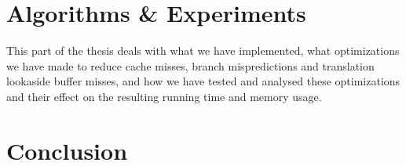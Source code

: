 \documentclass[11pt,twoside,openright]{article}
\begin{document}








\newpage
\clearpage
\part{Algorithms \& Experiments}
This part of the thesis deals with what we have implemented, what optimizations we have made to reduce cache misses, branch mispredictions and translation lookaside buffer misses, and how we have tested and analysed these optimizations and their effect on the resulting running time and memory usage.
%









\newpage
\clearpage
\part{Conclusion}








\end{document}
